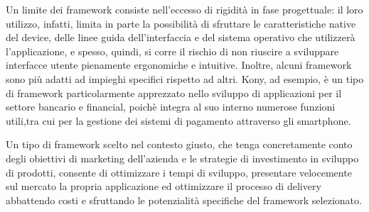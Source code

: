 Un limite dei framework consiste nell’eccesso di rigidità in fase progettuale: il loro utilizzo, infatti, limita in parte la possibilità di sfruttare le caratteristiche native del device, delle linee guida dell’interfaccia e del sistema operativo che utilizzerà l’applicazione, e spesso, quindi, si corre il rischio di non riuscire a sviluppare interfacce utente pienamente ergonomiche e intuitive.
Inoltre, alcuni framework sono più adatti ad impieghi specifici rispetto ad altri. Kony, ad esempio, è un tipo di framework particolarmente apprezzato nello sviluppo di applicazioni per il settore bancario e financial, poichè integra al suo interno numerose funzioni utili,tra cui per la gestione dei sistemi di pagamento attraverso gli smartphone.

Un tipo di framework scelto nel contesto giusto, che tenga concretamente conto degli obiettivi di marketing dell’azienda e le strategie di investimento in sviluppo di prodotti, consente di ottimizzare i tempi di sviluppo, presentare velocemente sul mercato la propria applicazione ed ottimizzare il processo di delivery abbattendo costi e sfruttando le potenzialità specifiche del framework selezionato.\\
\hspace*{\fill}\cite{web:framework}

